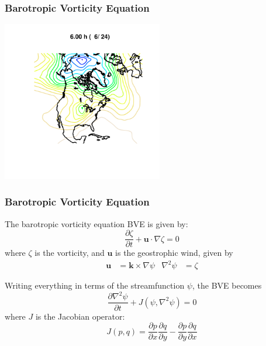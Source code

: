 \documentclass[aspectratio=43,9pt]{beamer}
\begin{document}
%
%
\begin{frame}
	\frametitle{Barotropic Vorticity Equation}
	\begin{center}
		\includegraphics[width=7cm]{barovort}
	\end{center}
\end{frame}
%
%
\begin{frame}
	\frametitle{Barotropic Vorticity Equation}
	\begin{myitemize}{2ex}
		\item The barotropic vorticity equation BVE is given by:
			\begin{equation*}
				\frac{\partial \zeta}{\partial t}+\bm u\cdot\nabla\zeta=0
			\end{equation*}
			where $\zeta$ is the vorticity, and $\bm u$ is the geostrophic wind, given by
			\begin{align*}
				\bm u&=\bm k\times\nabla\psi		&		\nabla^2\psi&=\zeta
			\end{align*}
		\item Writing everything in terms of the streamfunction $\psi$, the BVE becomes
			\begin{equation*}
				\frac{\partial\nabla^2\psi}{\partial t}+J(\psi,\nabla^2\psi)=0
			\end{equation*}
			where $J$ is the Jacobian operator:
			\begin{equation*}
				J(p,q)=\frac{\partial p}{\partial x}\frac{\partial q}{\partial y}-\frac{\partial p}{\partial y}\frac{\partial q}{\partial x}
			\end{equation*}
	\end{myitemize}
\end{frame}
%
\end{document}
